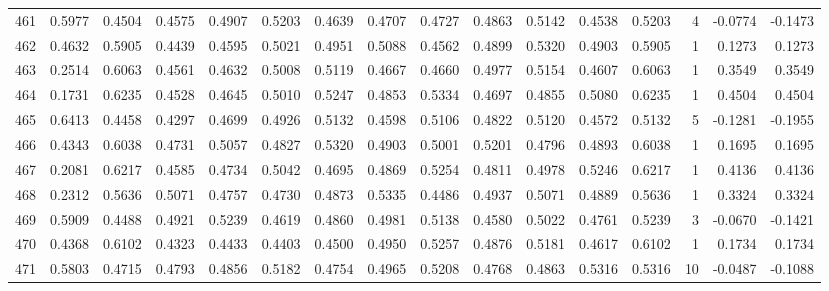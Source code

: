 \begin{tabular}{lrrrrrrrrrrrrrrr}
461 &      0.5977 &  0.4504 &  0.4575 &  0.4907 &  0.5203 &  0.4639 &  0.4707 &  0.4727 &  0.4863 &  0.5142 &   0.4538 &     0.5203 &      4 &                   -0.0774 &                    -0.1473 \\
462 &      0.4632 &  0.5905 &  0.4439 &  0.4595 &  0.5021 &  0.4951 &  0.5088 &  0.4562 &  0.4899 &  0.5320 &   0.4903 &     0.5905 &      1 &                    0.1273 &                     0.1273 \\
463 &      0.2514 &  0.6063 &  0.4561 &  0.4632 &  0.5008 &  0.5119 &  0.4667 &  0.4660 &  0.4977 &  0.5154 &   0.4607 &     0.6063 &      1 &                    0.3549 &                     0.3549 \\
464 &      0.1731 &  0.6235 &  0.4528 &  0.4645 &  0.5010 &  0.5247 &  0.4853 &  0.5334 &  0.4697 &  0.4855 &   0.5080 &     0.6235 &      1 &                    0.4504 &                     0.4504 \\
465 &      0.6413 &  0.4458 &  0.4297 &  0.4699 &  0.4926 &  0.5132 &  0.4598 &  0.5106 &  0.4822 &  0.5120 &   0.4572 &     0.5132 &      5 &                   -0.1281 &                    -0.1955 \\
466 &      0.4343 &  0.6038 &  0.4731 &  0.5057 &  0.4827 &  0.5320 &  0.4903 &  0.5001 &  0.5201 &  0.4796 &   0.4893 &     0.6038 &      1 &                    0.1695 &                     0.1695 \\
467 &      0.2081 &  0.6217 &  0.4585 &  0.4734 &  0.5042 &  0.4695 &  0.4869 &  0.5254 &  0.4811 &  0.4978 &   0.5246 &     0.6217 &      1 &                    0.4136 &                     0.4136 \\
468 &      0.2312 &  0.5636 &  0.5071 &  0.4757 &  0.4730 &  0.4873 &  0.5335 &  0.4486 &  0.4937 &  0.5071 &   0.4889 &     0.5636 &      1 &                    0.3324 &                     0.3324 \\
469 &      0.5909 &  0.4488 &  0.4921 &  0.5239 &  0.4619 &  0.4860 &  0.4981 &  0.5138 &  0.4580 &  0.5022 &   0.4761 &     0.5239 &      3 &                   -0.0670 &                    -0.1421 \\
470 &      0.4368 &  0.6102 &  0.4323 &  0.4433 &  0.4403 &  0.4500 &  0.4950 &  0.5257 &  0.4876 &  0.5181 &   0.4617 &     0.6102 &      1 &                    0.1734 &                     0.1734 \\
471 &      0.5803 &  0.4715 &  0.4793 &  0.4856 &  0.5182 &  0.4754 &  0.4965 &  0.5208 &  0.4768 &  0.4863 &   0.5316 &     0.5316 &     10 &                   -0.0487 &                    -0.1088 \\

\end{tabular}
